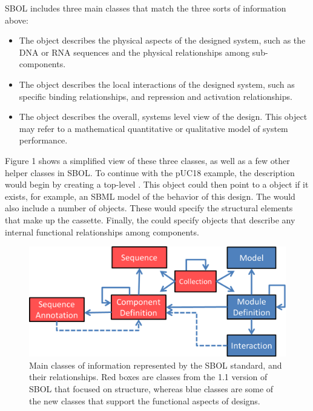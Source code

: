 SBOL includes three main classes that match the three sorts of information above:
\begin{itemize}
\item The  object describes the physical aspects of the designed system, such as the DNA or RNA sequences and the physical relationships among sub-components.
\item The  object describes the local interactions of the designed system, such as specific binding relationships, and repression and activation relationships. 
\item The  object describes the overall, systems level view of the design. This object may refer to a mathematical quantitative or qualitative model of system performance. 
\end{itemize}

Figure 1 shows a simplified view of these three classes, as well as a few other helper classes in SBOL. To continue with the pUC18 example, the description would begin by creating a top-level . This object could then point to a  object if it exists, for example, an SBML model of the behavior of this design. The  would also include a number of  objects. These would specify the structural elements that make up the cassette. Finally, the  could specify  objects that describe any internal functional relationships among components. 

\begin{figure}[ht]
\begin{center}
\includegraphics[scale=0.7]{images/OverviewFigforSpec-v6.png}
\caption{Main classes of information represented by the SBOL standard, and their relationships.  Red boxes are classes from the 1.1 version of SBOL that focused on structure, whereas blue classes are some of the new classes that support the functional aspects of designs.}
\label{images:overview1}
\end{center}
\end{figure}

